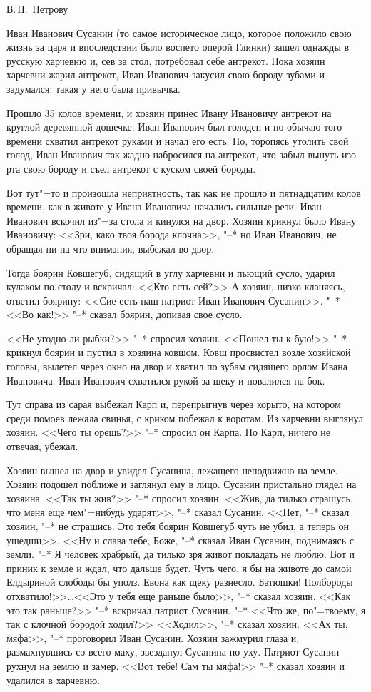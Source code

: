 \begin{flushright}
В.\,Н.~Петрову
\end{flushright}

Иван Иванович Сусанин (то самое историческое лицо, которое положило свою жизнь за царя и впоследствии было воспето оперой Глинки) зашел однажды в русскую харчевню и, сев за стол, потребовал себе антрекот. Пока хозяин харчевни жарил антрекот, Иван Иванович закусил свою бороду зубами и задумался: такая у него была привычка.

Прошло 35 колов времени, и хозяин принес Ивану Ивановичу антрекот на круглой деревянной дощечке. Иван Иванович был голоден и по обычаю того времени схватил антрекот руками и начал его есть. Но, торопясь утолить свой голод, Иван Иванович так жадно набросился на антрекот, что забыл вынуть изо рта свою бороду и съел антрекот с куском своей бороды.

Вот тут"=то и произошла неприятность, так как не прошло и пятнадцатим колов времени, как в животе у Ивана Ивановича начались сильные рези. Иван Иванович вскочил из"=за стола и кинулся на двор. Хозяин крикнул было Ивану Ивановичу: <<Зри, како твоя борода клочна>>, "--* но Иван Иванович, не обращая ни на что внимания, выбежал во двор.

Тогда боярин Ковшегуб, сидящий в углу харчевни и пьющий сусло, ударил кулаком по столу и вскричал: <<Кто есть сей?>> А хозяин, низко кланяясь, ответил боярину: <<Сие есть наш патриот Иван Иванович Сусанин>>. "--* <<Во как!>> "--* сказал боярин, допивая свое сусло.

<<Не угодно ли рыбки?>> "--* спросил хозяин. <<Пошел ты к бую!>> "--* крикнул боярин и пустил в хозяина ковшом. Ковш просвистел возле хозяйской головы, вылетел через окно на двор и хватил по зубам сидящего орлом Ивана Ивановича. Иван Иванович схватился рукой за щеку и повалился на бок.

Тут справа из сарая выбежал Карп и, перепрыгнув через корыто, на котором среди помоев лежала свинья, с криком побежал к воротам. Из харчевни выглянул хозяин. <<Чего ты орешь?>> "--* спросил он Карпа. Но Карп, ничего не отвечая, убежал.

Хозяин вышел на двор и увидел Сусанина, лежащего неподвижно на земле. Хозяин подошел поближе и заглянул ему в лицо. Сусанин пристально глядел на хозяина. <<Так ты жив?>> "--* спросил хозяин. <<Жив, да тилько страшусь, что меня еще чем"=нибудь ударят>>, "--* сказал Сусанин. <<Нет, "--* сказал хозяин, "--* не страшись. Это тебя боярин Ковшегуб чуть не убил, а теперь он ушедши>>. <<Ну и слава тебе, Боже, "--* сказал Иван Сусанин, поднимаясь с земли. "--* Я человек храбрый, да тилько зря живот покладать не люблю. Вот и приник к земле и ждал, что дальше будет. Чуть чего, я бы на животе до самой Елдыриной слободы бы уполз. Евона как щеку разнесло. Батюшки! Полбороды отхватило!>>\dots <<Это у тебя еще раньше было>>, "--* сказал хозяин. <<Как это так раньше?>> "--* вскричал патриот Сусанин. "--* <<Что же, по"=твоему, я так с клочной бородой ходил?>> <<Ходил>>, "--* сказал хозяин. <<Ах ты, мяфа>>, "--* проговорил Иван Сусанин. Хозяин зажмурил глаза и, размахнувшись со всего маху, звезданул Сусанина по уху. Патриот Сусанин рухнул на землю и замер. <<Вот тебе! Сам ты мяфа!>> "--* сказал хозяин и удалился в харчевню.

